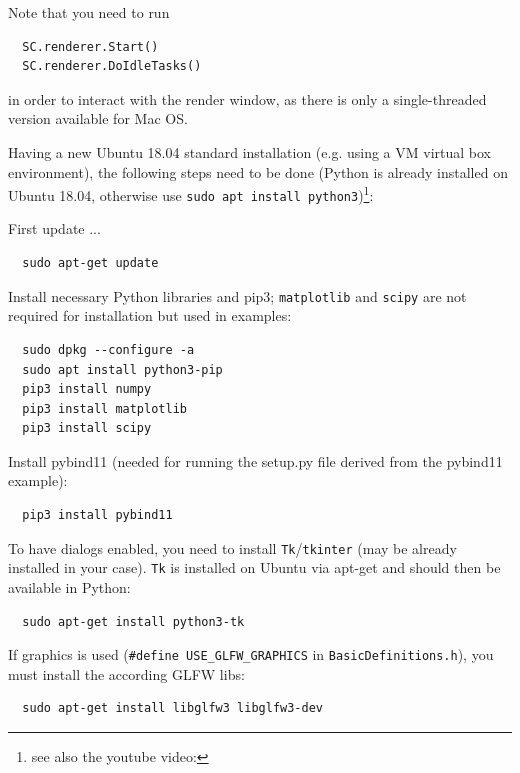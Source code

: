 \noindent Note that you need to run 
\pythonstyle\begin{lstlisting}
  SC.renderer.Start()
  SC.renderer.DoIdleTasks()
\end{lstlisting}
in order to interact with the render window, as there is only a single-threaded version available for Mac OS.

%
Having a new Ubuntu 18.04 standard installation (e.g. using a VM virtual box environment), the following steps need to be done (Python  is already installed on Ubuntu 18.04, otherwise use \texttt{sudo apt install python3})\footnote{see also the youtube video: }:

\noindent First update ...
\plainlststyle
\begin{lstlisting}
  sudo apt-get update
\end{lstlisting}

\noindent 
Install necessary Python libraries and pip3; \texttt{matplotlib} and \texttt{scipy} are not required for installation but used in \codeName examples:
\begin{lstlisting}
  sudo dpkg --configure -a
  sudo apt install python3-pip
  pip3 install numpy
  pip3 install matplotlib
  pip3 install scipy
\end{lstlisting}

\noindent Install pybind11 (needed for running the setup.py file derived from the pybind11 example):
\begin{lstlisting}
  pip3 install pybind11
\end{lstlisting}

\noindent To have dialogs enabled, you need to install \texttt{Tk}/\texttt{tkinter} (may be already installed in your case). 
\texttt{Tk} is installed on Ubuntu via apt-get and should then be available in Python:
\begin{lstlisting}
  sudo apt-get install python3-tk
\end{lstlisting}

\noindent 
If graphics is used (\texttt{\#define USE\_GLFW\_GRAPHICS} in \texttt{BasicDefinitions.h}), you must install the according GLFW libs:
\begin{lstlisting}
  sudo apt-get install libglfw3 libglfw3-dev
\end{lstlisting}

